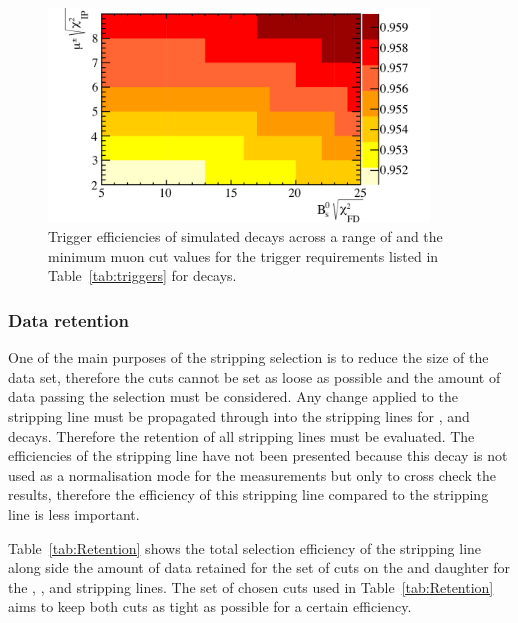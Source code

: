 \begin{figure}[tbp]
   \centering
        \includegraphics[width=0.9\textwidth]{./Figs/Selection/Trigger.pdf}
    \caption{Trigger efficiencies of \bsmumu simulated decays across a range of \bs \chiFD and the minimum muon \chiIP cut values for the trigger requirements listed in Table~\ref{tab:triggers} for \bmumu decays.}%
    \label{fig:triggereffplots}
\end{figure}


\clearpage
\subsubsection*{Data retention}

One of the main purposes of the stripping selection is to reduce the size of the data set, therefore the cuts cannot be set as loose as possible and the amount of data passing the selection must be considered. Any change applied to the \bmumu stripping line must be propagated through into the stripping lines for \bhh, \bujpsik and \bsjpsiphi decays. Therefore the retention of all stripping lines must be evaluated. The efficiencies of the \bsjpsiphi stripping line have not been presented because this decay is not used as a normalisation mode for the \BF measurements but only to cross check the results, therefore the efficiency of this stripping line compared to the \bmumu stripping line is less important.

Table~\ref{tab:Retention} shows the total selection efficiency of the \bmumu stripping line along side the amount of data retained for the set of cuts on the \chiFD and daughter \chiIP for the \bmumu, \bhh, \bujpsik and \bsjpsiphi stripping lines. %
The set of chosen cuts used in Table~\ref{tab:Retention} aims to keep both cuts as tight as possible for a certain \bsmumu efficiency. 



